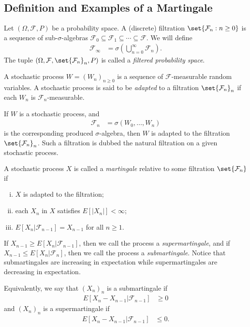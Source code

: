 \documentclass[10pt]{mypackage}
\begin{document}
\subsection{Definition and Examples of a Martingale}%
\begin{definition}
  Let $\left( \Omega,\mathcal{F},P \right)$ be a probability space. A (discrete) filtration $\set{\mathcal{F}_n : n\geq 0}$ is a sequence of sub-$\sigma$-algebras $\mathcal{F}_0\subseteq \mathcal{F}_1\subseteq\cdots\subseteq \mathcal{F}$. We will define
  \begin{align*}
    \mathcal{F}_{\infty} &= \sigma\left( \bigcup_{n=0}^{\infty}\mathcal{F}_n \right).
  \end{align*}
  The tuple $\left( \Omega,\mathcal{F},\set{\mathcal{F}_n}_{n},P \right)$ is called a \textit{filtered probability space}.
\end{definition}
\begin{definition}
  A stochastic process $W = \left( W_n \right)_{n\geq 0}$ is a sequence of $\mathcal{F}$-measurable random variables. A stochastic process is said to be \textit{adapted} to a filtration $\set{\mathcal{F}_n}_{n}$ if each $W_n$ is $\mathcal{F}_n$-measurable.
\end{definition}
\begin{example}
  If $W$ is a stochastic process, and
  \begin{align*}
    \mathcal{F}_n &= \sigma\left( W_0,\dots,W_n \right)
  \end{align*}
  is the corresponding produced $\sigma$-algebra, then $W$ is adapted to the filtration $\set{\mathcal{F}_n}_{n}$. Such a filtration is dubbed the natural filtration on a given stochastic process.
\end{example}
\begin{definition}
  A stochastic process $X$ is called a \textit{martingale} relative to some filtration $\set{\mathcal{F}_n}$ if
  \begin{enumerate}[(i)]
    \item $X$ is adapted to the filtration;
    \item each $X_n$ in $X$ satisfies $E\left[ \left\vert X_n \right\vert \right] < \infty$;
    \item $E\left[ X_n|\mathcal{F}_{n-1} \right] = X_{n-1}$ for all $n\geq 1$.
  \end{enumerate}
  If $X_{n-1}\geq E\left[ X_n|\mathcal{F}_{n-1} \right]$, then we call the process a \textit{supermartingale}, and if $X_{n-1}\leq E\left[ X_n|\mathcal{F}_n \right]$, then we call the process a \textit{submartingale}. Notice that submartingales are increasing in expectation while supermartingales are decreasing in expectation.

  Equivalently, we say that $\left( X_n \right)_n$ is a submartingale if
  \begin{align*}
    E\left[ X_n-X_{n-1}|\mathcal{F}_{n-1} \right] &\geq 0
  \end{align*}
  and $\left( X_n \right)_n$ is a supermartingale if
  \begin{align*}
    E\left[ X_{n}-X_{n-1}|\mathcal{F}_{n-1} \right] &\leq 0.
  \end{align*}
\end{definition}
\end{document}
